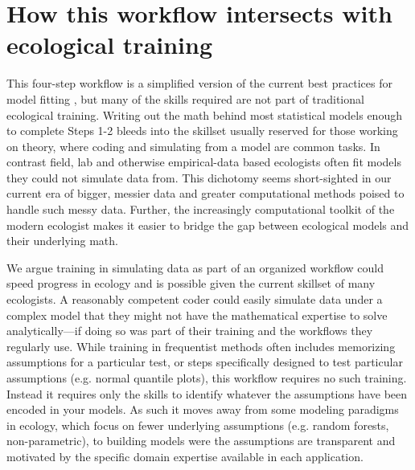 \documentclass[11pt]{article}
\begin{document}

\section*{How this workflow intersects with ecological training} %

This four-step workflow is a simplified version of the current best practices for model fitting  \citep{betanworkflow,vandeschoot2021}, but many of the skills required are not part of traditional ecological training. Writing out the math behind most statistical models enough to complete Steps 1-2 bleeds into the skillset usually reserved for those working on theory, where coding and simulating from a model are common tasks. In contrast field, lab and otherwise empirical-data based ecologists often fit models they could not simulate data from. This dichotomy seems short-sighted in our current era of bigger, messier data and greater computational methods poised to handle such messy data. Further, the increasingly computational toolkit of the modern ecologist makes it easier to bridge the gap between ecological models and their underlying math. 

We argue training in simulating data as part of an organized workflow could speed progress in ecology and is possible given the current skillset of many ecologists. A reasonably competent coder could easily simulate data under a complex model that they might not have the mathematical expertise to solve analytically---if doing so was part of their training and the workflows they regularly use. While training in frequentist methods often includes memorizing assumptions for a particular test, or steps specifically designed to test particular assumptions (e.g. normal quantile plots), this workflow requires no such training. Instead it requires only the skills to identify whatever the assumptions have been encoded in your models. As such it moves away from some modeling paradigms in ecology, which focus on fewer underlying assumptions (e.g. random forests, non-parametric), to building models were the assumptions are transparent and motivated by the specific domain expertise available in each application. %
\end{document}
